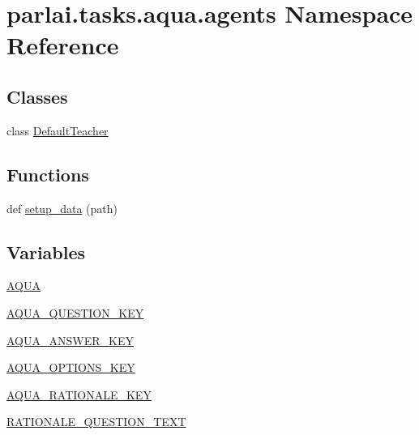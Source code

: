 \hypertarget{namespaceparlai_1_1tasks_1_1aqua_1_1agents}{}\section{parlai.\+tasks.\+aqua.\+agents Namespace Reference}
\label{namespaceparlai_1_1tasks_1_1aqua_1_1agents}
\subsection*{Classes}
\begin{DoxyCompactItemize}
\item 
class \hyperlink{classparlai_1_1tasks_1_1aqua_1_1agents_1_1DefaultTeacher}{Default\+Teacher}
\end{DoxyCompactItemize}
\subsection*{Functions}
\begin{DoxyCompactItemize}
\item 
def \hyperlink{namespaceparlai_1_1tasks_1_1aqua_1_1agents_a2d4e9f4e80d4edc0646c7e3d52be9f25}{setup\+\_\+data} (path)
\end{DoxyCompactItemize}
\subsection*{Variables}
\begin{DoxyCompactItemize}
\item 
\hyperlink{namespaceparlai_1_1tasks_1_1aqua_1_1agents_a4b9c5baa9cc806e9b791cc3dda957e1d}{A\+Q\+UA}
\item 
\hyperlink{namespaceparlai_1_1tasks_1_1aqua_1_1agents_a4c189d816d171d01065ddb42d25a540c}{A\+Q\+U\+A\+\_\+\+Q\+U\+E\+S\+T\+I\+O\+N\+\_\+\+K\+EY}
\item 
\hyperlink{namespaceparlai_1_1tasks_1_1aqua_1_1agents_a3a196fec649bef7aeb2a9c63d7268519}{A\+Q\+U\+A\+\_\+\+A\+N\+S\+W\+E\+R\+\_\+\+K\+EY}
\item 
\hyperlink{namespaceparlai_1_1tasks_1_1aqua_1_1agents_a76e39dcdf981c39cd1d2ab8d8a9d8715}{A\+Q\+U\+A\+\_\+\+O\+P\+T\+I\+O\+N\+S\+\_\+\+K\+EY}
\item 
\hyperlink{namespaceparlai_1_1tasks_1_1aqua_1_1agents_a7c4488220646bf967848c85357a432ce}{A\+Q\+U\+A\+\_\+\+R\+A\+T\+I\+O\+N\+A\+L\+E\+\_\+\+K\+EY}
\item 
\hyperlink{namespaceparlai_1_1tasks_1_1aqua_1_1agents_a3bcc8378848683ffb1d7ae96e545f6a8}{R\+A\+T\+I\+O\+N\+A\+L\+E\+\_\+\+Q\+U\+E\+S\+T\+I\+O\+N\+\_\+\+T\+E\+XT}
\end{DoxyCompactItemize}


